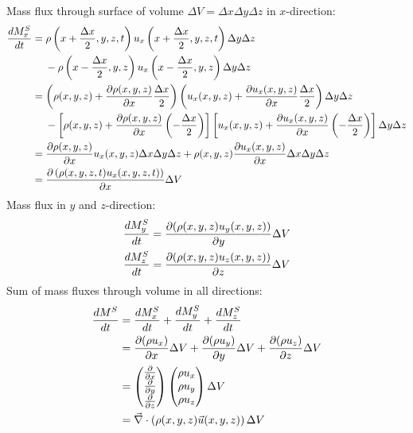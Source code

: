 Mass flux through surface of volume $\Delta V = \Delta x \Delta y \Delta z$ in $x$-direction:
\begin{align}
\begin{split}
\frac{d M_x^S}{d t} &= \rho \left(x+\frac{\Delta x}{2},y,z,t\right)u_x\left(x+\frac{\Delta x}{2},y,z,t\right)\Delta y \Delta z\\
&\hspace{4.5mm} - \rho \left(x-\frac{\Delta x}{2},y,z\right)u_x\left(x-\frac{\Delta x}{2},y,z\right)\Delta y \Delta z
\\
&=\left(\rho(x,y,z)+\frac{\partial \rho(x,y,z)}{\partial x}\frac{\Delta x}{2}\right)\left(u_x(x,y,z)+\frac{\partial u_x(x,y,z)}{\partial x}\frac{\Delta x}{2}\right) \Delta y \Delta z \\
&\hspace{4.5mm} - \left[\rho(x,y,z)+\frac{\partial \rho(x,y,z)}{\partial x}\left(-\frac{\Delta x}{2}\right)\right]\left[u_x(x,y,z)+\frac{\partial u_x(x,y,z)}{\partial x}\left(-\frac{\Delta x}{2}\right)\right] \Delta y \Delta z
\\
&=\frac{\partial \rho(x,y,z)}{\partial x}u_x(x,y,z)\Delta x \Delta y \Delta z  + \rho(x,y,z)\frac{\partial u_x(x,y,z)}{\partial x}\Delta x \Delta y \Delta z\\
&=\frac{\partial \left(\rho(x,y,z,t)u_x(x,y,z,t)\right)}{\partial x}\Delta V
\end{split}
\end{align}
Mass flux in $y$ and $z$-direction:
\begin{align}
\frac{d M_y^S}{d t} &= \frac{\partial (\rho(x,y,z)u_y(x,y,z))}{\partial y}\Delta V\\
\frac{d M_z^S}{d t} &= \frac{\partial (\rho(x,y,z)u_z(x,y,z))}{\partial z}\Delta V
\end{align}
Sum of mass fluxes through volume in all directions:
\begin{align}
\frac{d M^S}{d t} &= \frac{d M_x^S}{d t} + \frac{d M_y^S}{d t} + \frac{d M_z^S}{d t} \\
&= \frac{\partial (\rho u_x)}{\partial x}\Delta V + \frac{\partial (\rho u_y)}{\partial y}\Delta V + \frac{\partial (\rho u_z)}{\partial z}\Delta V\\
&=
\begin{pmatrix}
\frac{\partial }{\partial x} \\ \frac{\partial }{\partial y} \\ \frac{\partial }{\partial z}
\end{pmatrix}
\begin{pmatrix}
\rho u_x \\ \rho u_y \\ \rho u_z
\end{pmatrix}
\Delta V \\
&= \vec{\nabla}\cdot\left(\rho(x,y,z)\vec{u}(x,y,z)\right)\Delta V
\end{align}
